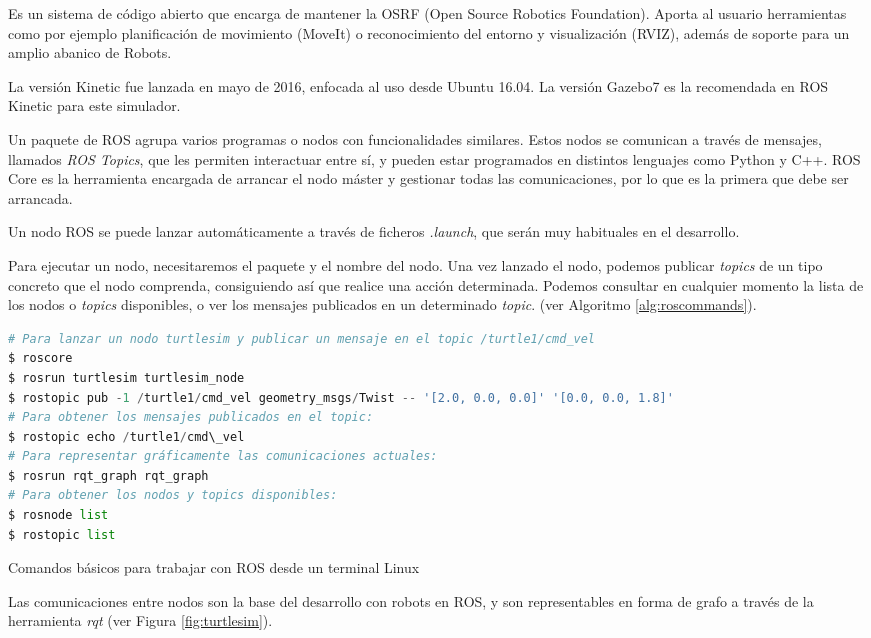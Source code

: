 \documentclass[12pt,spanish,chapterprefix, numbers=noenddot]{book}
\numberwithin{equation}{section}
\numberwithin{figure}{section}
\begin{document}
Es un sistema de código abierto que encarga de mantener la OSRF (Open Source Robotics Foundation). Aporta al usuario herramientas como por ejemplo planificación de movimiento (MoveIt) o reconocimiento del entorno y visualización (RVIZ), además de soporte para un amplio abanico de Robots. 

La versión Kinetic fue lanzada en mayo de 2016, enfocada al uso desde Ubuntu 16.04. La versión Gazebo7 es la recomendada en ROS Kinetic para este simulador. 

Un paquete de ROS agrupa varios programas o nodos con funcionalidades similares. Estos nodos se comunican  a través de mensajes, llamados \textit{ROS Topics}, que les permiten interactuar entre sí, y pueden estar programados en distintos lenguajes como Python y C++.
ROS Core es la herramienta encargada de arrancar el nodo máster y gestionar todas las comunicaciones, por lo que es la primera que debe ser arrancada. 

Un nodo ROS se puede lanzar automáticamente a través de  ficheros \textit{.launch}, que serán muy habituales en el desarrollo. 

Para ejecutar un nodo, necesitaremos el paquete y el nombre del nodo. Una vez lanzado el nodo, podemos publicar \textit{topics} de un tipo concreto que el nodo comprenda, consiguiendo así que realice una acción determinada. Podemos consultar en cualquier momento la lista de los nodos o \textit{topics} disponibles, o ver los mensajes publicados en un determinado \textit{topic}. (ver Algoritmo \ref{alg:roscommands}).

\begin{algorithm}[htb!]
	\begin{lstlisting}[breaklines=true,language=python]
# Para lanzar un nodo turtlesim y publicar un mensaje en el topic /turtle1/cmd_vel
$ roscore
$ rosrun turtlesim turtlesim_node
$ rostopic pub -1 /turtle1/cmd_vel geometry_msgs/Twist -- '[2.0, 0.0, 0.0]' '[0.0, 0.0, 1.8]'
# Para obtener los mensajes publicados en el topic: 
$ rostopic echo /turtle1/cmd\_vel
# Para representar gráficamente las comunicaciones actuales:
$ rosrun rqt_graph rqt_graph
# Para obtener los nodos y topics disponibles: 
$ rosnode list 
$ rostopic list
	\end{lstlisting}
\caption{\label{alg:roscommands}Comandos básicos para trabajar con ROS desde un terminal Linux}
\end{algorithm}

Las comunicaciones entre nodos son la base del desarrollo con robots en ROS, y son representables en forma de grafo a través de la herramienta \textit{rqt} (ver Figura \ref{fig:turtlesim}).
\end{document}

